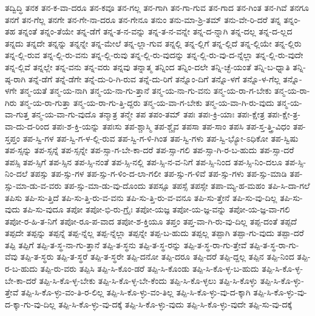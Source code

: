 {ತದ್ವಿದ್ಧಿ
ತನಕ
ತನ-ಕ-ವಾ-ದರೂ
ತನ-ಕವೂ
ತನ-ಗಲ್ಲ
ತನ-ಗಾಗಿ
ತನ-ಗಾ-ಗುವ
ತನ-ಗಾದ
ತನ-ಗಿಂತ
ತನ-ಗಿವೆ
ತನಗೂ
ತನಗೆ
ತನ-ಗೆಲ್ಲ
ತನಗೇ
ತನ-ಗೇ-ನಾ-ದರೂ
ತನ-ಗೇನೂ
ತನುಂ
ತನು-ಮಾ-ಶ್ರಿ-ತಮ್
ತನು-ವೇ-ರಿ-ದರೆ
ತನ್ನ
ತನ್ನಂ-ತಹ
ತನ್ನಂತೆ
ತನ್ನಂ-ತೆಯೇ
ತನ್ನ-ಡೆಗೆ
ತನ್ನ-ತ-ನ-ವನ್ನು
ತನ್ನ-ತ-ನ-ವನ್ನೇ
ತನ್ನ-ದ-ನ್ನಾಗಿ
ತನ್ನ-ದಲ್ಲ
ತನ್ನ-ದ-ಲ್ಲದ
ತನ್ನದು
ತನ್ನದೇ
ತನ್ನನ್ನು
ತನ್ನನ್ನೇ
ತನ್ನ-ಮೇಲೆ
ತನ್ನ-ಲ್ಲಾ-ಗುವ
ತನ್ನಲ್ಲಿ
ತನ್ನ-ಲ್ಲಿಗೆ
ತನ್ನ-ಲ್ಲಿದೆ
ತನ್ನ-ಲ್ಲಿಯೇ
ತನ್ನ-ಲ್ಲಿರು
ತನ್ನ-ಲ್ಲಿ-ರುವ
ತನ್ನ-ಲ್ಲಿ-ರು-ವನು
ತನ್ನ-ಲ್ಲಿ-ರುವು
ತನ್ನ-ಲ್ಲಿ-ರು-ವುದನ್ನು
ತನ್ನ-ಲ್ಲಿ-ರು-ವು-ದ-ನ್ನೆಲ್ಲಾ
ತನ್ನ-ಲ್ಲಿ-ರು-ವುದೇ
ತನ್ನ-ಲ್ಲಿವೆ
ತನ್ನಲ್ಲೇ
ತನ್ನ-ವನು
ತನ್ನ-ವರು
ತನ್ನವು
ತನ್ನಾತ್ಮ
ತನ್ನಿಂದ
ತನ್ನಿಂ-ದಲೇ
ತನ್ನಿ-ಚ್ಛೆ-ಯಂತೆ
ತನ್ನಿ-ಬ-ಧ್ನಾತಿ
ತನ್ನಿ-ಷ್ಠ-ರಾಗಿ
ತನ್ನೆ-ಡೆಗೆ
ತನ್ನೆ-ಡೆಗೇ
ತನ್ನೆ-ದು-ರಿ-ಗಿ-ರುವ
ತನ್ನೆ-ದು-ರಿಗೆ
ತನ್ನೊಂ-ದಿಗೆ
ತನ್ನೊ-ಳಗೆ
ತನ್ನೊ-ಳ-ಗೆಲ್ಲ
ತನ್ನೊ-ಳಗೇ
ತನ್ಮ-ಯತೆ
ತನ್ಮ-ಯ-ನಾಗಿ
ತನ್ಮ-ಯ-ನಾ-ಗು-ತ್ತಾನೆ
ತನ್ಮ-ಯ-ನಾ-ಗು-ವನು
ತನ್ಮ-ಯ-ರಾ-ಗ-ಬೇಕು
ತನ್ಮ-ಯ-ರಾ-ಗಿರು
ತನ್ಮ-ಯ-ರಾ-ಗುತ್ತಾ
ತನ್ಮ-ಯ-ರಾ-ಗು-ತ್ತಿ-ದ್ದರು
ತನ್ಮ-ಯ-ವಾ-ಗ-ಬೇಕು
ತನ್ಮ-ಯ-ವಾ-ಗಿ-ರು-ವುದು
ತನ್ಮ-ಯ-ವಾ-ಗುತ್ತ
ತನ್ಮ-ಯ-ವಾ-ಗು-ವುದೊ
ತನ್ಮಾತ್ರ
ತನ್ಮೇ
ತಪ
ತಪಂ-ತಮ್
ತಪಃ
ತಪಃ-ಕ್ರಿ-ಯಾಃ
ತಪಃ-ಕ್ಷೇತ್ರ
ತಪಃ-ಕ್ಷೇ-ತ್ರ-ವಾ-ದು-ದ-ರಿಂದ
ತಪಃ-ಶ-ಕ್ತಿ-ಯನ್ನು
ತಪಃಸು
ತಪ-ಶ್ಚಾಸ್ಮಿ
ತಪ-ಶ್ಚೈವ
ತಪಸಾ
ತಪ-ಸಾಂ
ತಪಸಿ
ತಪ-ಸ್ತ-ತ್ತ್ರಿ-ವಿಧಂ
ತಪ-ಸ್ತಪ್ತಂ
ತಪ-ಸ್ವಿ-ಗಳ
ತಪ-ಸ್ವಿ-ಗ-ಳ-ಲ್ಲಿ-ರುವ
ತಪ-ಸ್ವಿ-ಗ-ಳಿ-ಗಿಂತ
ತಪ-ಸ್ವಿ-ಗಳು
ತಪ-ಸ್ವಿ-ಭ್ಯೋ-ಽಧಿಕೋ
ತಪ-ಸ್ವಿಷು
ತಪ-ಸ್ಸನ್ನು
ತಪ-ಸ್ಸನ್ನೆ
ತಪ-ಸ್ಸನ್ನೇ
ತಪ-ಸ್ಸಾ-ಗ-ಬೇ-ಕಾ-ದರೆ
ತಪ-ಸ್ಸಾ-ಗಲಿ
ತಪ-ಸ್ಸಾ-ಗಿ-ರ-ಬ-ಹುದು
ತಪ-ಸ್ಸಾ-ದರೆ
ತಪಸ್ಸಿ
ತಪ-ಸ್ಸಿಗೆ
ತಪ-ಸ್ಸಿನ
ತಪ-ಸ್ಸಿ-ನಂತೆ
ತಪ-ಸ್ಸಿ-ನಲ್ಲಿ
ತಪ-ಸ್ಸಿ-ನ-ವ-ನಿಗೆ
ತಪ-ಸ್ಸಿ-ನಿಂದ
ತಪ-ಸ್ಸಿ-ನಿಂ-ದಲೂ
ತಪ-ಸ್ಸಿ-ನಿಂ-ದಲೆ
ತಪಸ್ಸು
ತಪ-ಸ್ಸು-ಗಳ
ತಪ-ಸ್ಸು-ಗ-ಳಿಂ-ದ-ಲಾ-ಗಲೀ
ತಪ-ಸ್ಸು-ಗ-ಳಿವೆ
ತಪ-ಸ್ಸು-ಗಳು
ತಪ-ಸ್ಸು-ಮಾಡಿ
ತಪ-ಸ್ಸು-ಮಾ-ಡು-ವ-ವರು
ತಪ-ಸ್ಸು-ಮಾ-ಡು-ವು-ದೊಂದು
ತಪಸ್ಸೂ
ತಪಸ್ಸೆ
ತಪಸ್ಸೇ
ತಪಾ-ಮ್ಯ-ಹ-ಮಹಂ
ತಪಿ-ಸಿ-ದಾ-ಗಲೆ
ತಪಿಸು
ತಪಿ-ಸು-ತ್ತಿದೆ
ತಪಿ-ಸು-ತ್ತಿ-ರು-ವ-ವನು
ತಪಿ-ಸು-ತ್ತಿ-ರು-ವ-ವನೂ
ತಪಿ-ಸು-ತ್ತೇನೆ
ತಪಿ-ಸು-ವು-ದಿಲ್ಲ
ತಪಿ-ಸು-ವುದು
ತಪಿ-ಸು-ವುದೂ
ತಪೋ
ತಪೋ-ಭಿ-ರು-ಗ್ರೈಃ
ತಪೋ-ಯಜ್ಞ
ತಪೋ-ಯ-ಜ್ಞ-ವನ್ನು
ತಪೋ-ಯ-ಜ್ಞ-ವಾ-ಗಲಿ
ತಪೋ-ರ-ಹಿ-ತ-ನಿಗೆ
ತಪೋ-ರೂ-ಪ-ವಾದ
ತಪೋ-ಶ-ಕ್ತಿಯೂ
ತಪ್ತಂ
ತಪ್ತ-ವಾ-ಗಿ-ರು-ವು-ದಿಲ್ಲ
ತಪ್ಪ-ದಂತೆ
ತಪ್ಪದೆ
ತಪ್ಪದೇ
ತಪ್ಪನ್ನು
ತಪ್ಪನ್ನೆ
ತಪ್ಪ-ನ್ನೆಲ್ಲ
ತಪ್ಪ-ನ್ನೆಲ್ಲಾ
ತಪ್ಪನ್ನೇ
ತಪ್ಪ-ಬ-ಹುದು
ತಪ್ಪಲ್ಲ
ತಪ್ಪಾಗಿ
ತಪ್ಪಾ-ಗು-ವುದು
ತಪ್ಪಾ-ದರೆ
ತಪ್ಪಿ
ತಪ್ಪಿಗೆ
ತಪ್ಪಿ-ತ-ಸ್ಥ-ನಾ-ಗು-ತ್ತಾನೆ
ತಪ್ಪಿ-ತ-ಸ್ಥನು
ತಪ್ಪಿ-ತ-ಸ್ಥ-ರನ್ನು
ತಪ್ಪಿ-ತ-ಸ್ಥ-ರಾ-ಗು-ತ್ತೇವೆ
ತಪ್ಪಿ-ತ-ಸ್ಥ-ರಾ-ಗು-ವೆವು
ತಪ್ಪಿ-ತ-ಸ್ಥರು
ತಪ್ಪಿ-ತ-ಸ್ಥರೆ
ತಪ್ಪಿ-ತ-ಸ್ಥರೇ
ತಪ್ಪಿ-ದನೋ
ತಪ್ಪಿ-ದರೂ
ತಪ್ಪಿ-ದರೆ
ತಪ್ಪಿ-ದ್ದಲ್ಲ
ತಪ್ಪಿನ
ತಪ್ಪಿ-ನಿಂದ
ತಪ್ಪಿ-ರ-ಬ-ಹುದು
ತಪ್ಪಿ-ರು-ವರು
ತಪ್ಪಿಸಿ
ತಪ್ಪಿ-ಸಿ-ಕೊಂ-ಡರೆ
ತಪ್ಪಿ-ಸಿ-ಕೊಂಡು
ತಪ್ಪಿ-ಸಿ-ಕೊ-ಳ್ಳ-ಬ-ಹುದು
ತಪ್ಪಿ-ಸಿ-ಕೊ-ಳ್ಳ-ಬೇ-ಕಾ-ದರೆ
ತಪ್ಪಿ-ಸಿ-ಕೊ-ಳ್ಳ-ಬೇಕು
ತಪ್ಪಿ-ಸಿ-ಕೊ-ಳ್ಳ-ಬೇ-ಕೆಂದು
ತಪ್ಪಿ-ಸಿ-ಕೊ-ಳ್ಳಲು
ತಪ್ಪಿ-ಸಿ-ಕೊಳ್ಳು
ತಪ್ಪಿ-ಸಿ-ಕೊ-ಳ್ಳು-ತ್ತೇವೆ
ತಪ್ಪಿ-ಸಿ-ಕೊ-ಳ್ಳು-ವಂ-ತಿ-ರ-ಲಿಲ್ಲ
ತಪ್ಪಿ-ಸಿ-ಕೊ-ಳ್ಳು-ವಂ-ತಿಲ್ಲ
ತಪ್ಪಿ-ಸಿ-ಕೊ-ಳ್ಳು-ವು-ದ-ಕ್ಕಾಗಿ
ತಪ್ಪಿ-ಸಿ-ಕೊ-ಳ್ಳು-ವು-ದ-ಕ್ಕಾ-ಗು-ವು-ದಿಲ್ಲ
ತಪ್ಪಿ-ಸಿ-ಕೊ-ಳ್ಳು-ವು-ದಕ್ಕೆ
ತಪ್ಪಿ-ಸಿ-ಕೊ-ಳ್ಳು-ವುದು
ತಪ್ಪಿ-ಸಿ-ಕೊ-ಳ್ಳು-ವುದೇ
ತಪ್ಪಿ-ಸು-ವು-ದಕ್ಕೆ
}
